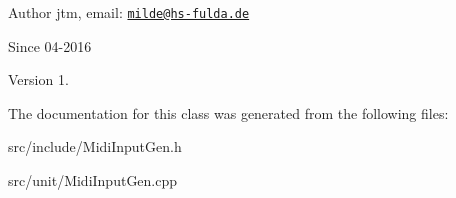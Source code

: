 \begin{DoxyAuthor}{Author}
jtm, email\-:  \href{mailto:milde@hs-fulda.de}{\tt milde@hs-\/fulda.\-de} 
\end{DoxyAuthor}
\begin{DoxySince}{Since}
04-\/2016 
\end{DoxySince}
\begin{DoxyVersion}{Version}
1. 
\end{DoxyVersion}


The documentation for this class was generated from the following files\-:\begin{DoxyCompactItemize}
\item 
src/include/Midi\-Input\-Gen.\-h\item 
src/unit/Midi\-Input\-Gen.\-cpp\end{DoxyCompactItemize}
